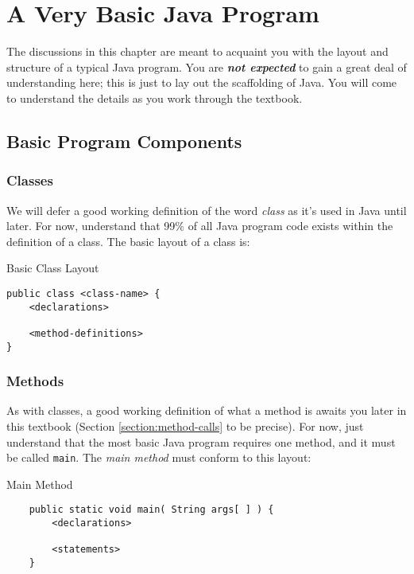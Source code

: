 
\chapter{A Very Basic Java Program}

\minitoc

The discussions in this chapter are meant to acquaint you with the layout and structure of a typical Java program.  You are \textbf{\textit{not expected}} to gain a great deal of understanding here; this is just to lay out the scaffolding of Java.  You will come to understand the details as you work through the textbook.

\section{Basic Program Components}

\subsection{Classes}

We will defer a good working definition of the word \textit{class} as it's used in Java until later.  For now, understand that 99\% of all Java program code exists within the definition of a class.  The basic layout of a class is:

\begin{javaformat}{Basic Class Layout}
\begin{verbatim}
public class <class-name> {
    <declarations>

    <method-definitions>
}
\end{verbatim}
\end{javaformat}

\subsection{Methods}

As with classes, a good working definition of what a method is awaits you later in this textbook (Section \ref{section:method-calls} to be precise).  For now, just understand that the most basic Java program requires one method, and it must be called \lstinline{main}.  The \textit{main method} must conform to this layout:

\begin{javaformat}{Main Method}
\begin{verbatim}
    public static void main( String args[ ] ) {
        <declarations>

        <statements>
    }
\end{verbatim}
\end{javaformat}

